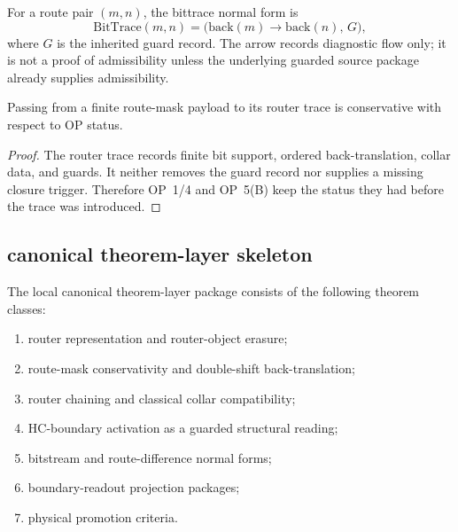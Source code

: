\begin{definition}
\label{def:v3360-r16-bittrace-normal-form}
For a route pair $(m,n)$, the bittrace normal form is
\[
 \mathrm{BitTrace}(m,n)
 =
 \bigl(\mathrm{back}(m)\rightarrow \mathrm{back}(n),\,G\bigr),
\]
where $G$ is the inherited guard record. The arrow records diagnostic flow only; it is not a proof of admissibility unless the underlying guarded source package already supplies admissibility.
\end{definition}

\begin{lemma}
\label{lem:v3360-r16-router-trace-conservativity}
Passing from a finite route-mask payload to its router trace is conservative with respect to OP status.
\end{lemma}

\begin{proof}
The router trace records finite bit support, ordered back-translation, collar data, and guards. It neither removes the guard record nor supplies a missing closure trigger. Therefore OP~1/4 and OP~5(B) keep the status they had before the trace was introduced.
\end{proof}

\subsection*{canonical theorem-layer skeleton}
\label{subsec:v3360-r16-canonical-theorem-layer-skeleton}

\begin{definition}
\label{def:v3360-r16-canonical-theorem-layer-package}
The local canonical theorem-layer package consists of the following theorem classes:
\begin{enumerate}[leftmargin=*]
 \item router representation and router-object erasure;
 \item route-mask conservativity and double-shift back-translation;
 \item router chaining and classical collar compatibility;
 \item HC-boundary activation as a guarded structural reading;
 \item bitstream and route-difference normal forms;
 \item boundary-readout projection packages;
 \item physical promotion criteria.
\end{enumerate}
\end{definition}

